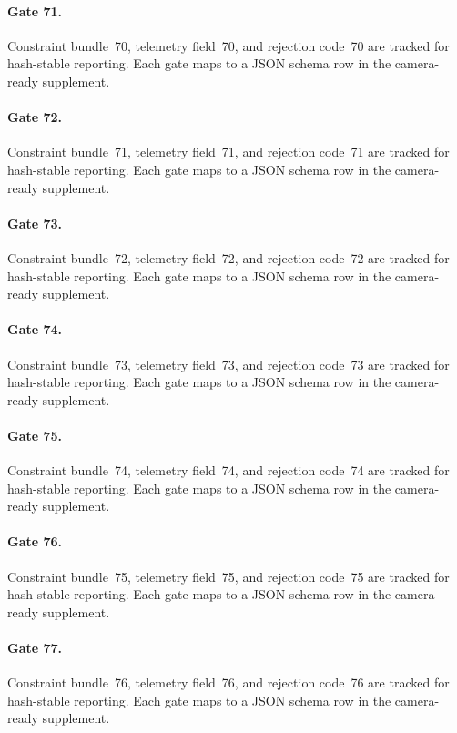 \documentclass[sigconf,nonacm]{acmart}
\begin{document}
\paragraph{Gate 71.}
Constraint bundle~70, telemetry field~70, and rejection code~70 are tracked for hash-stable reporting. Each gate maps to a JSON schema row in the camera-ready supplement. %

\paragraph{Gate 72.}
Constraint bundle~71, telemetry field~71, and rejection code~71 are tracked for hash-stable reporting. Each gate maps to a JSON schema row in the camera-ready supplement. %

\paragraph{Gate 73.}
Constraint bundle~72, telemetry field~72, and rejection code~72 are tracked for hash-stable reporting. Each gate maps to a JSON schema row in the camera-ready supplement. %

\paragraph{Gate 74.}
Constraint bundle~73, telemetry field~73, and rejection code~73 are tracked for hash-stable reporting. Each gate maps to a JSON schema row in the camera-ready supplement. %

\paragraph{Gate 75.}
Constraint bundle~74, telemetry field~74, and rejection code~74 are tracked for hash-stable reporting. Each gate maps to a JSON schema row in the camera-ready supplement. %

\paragraph{Gate 76.}
Constraint bundle~75, telemetry field~75, and rejection code~75 are tracked for hash-stable reporting. Each gate maps to a JSON schema row in the camera-ready supplement. %

\paragraph{Gate 77.}
Constraint bundle~76, telemetry field~76, and rejection code~76 are tracked for hash-stable reporting. Each gate maps to a JSON schema row in the camera-ready supplement. %
\end{document}
